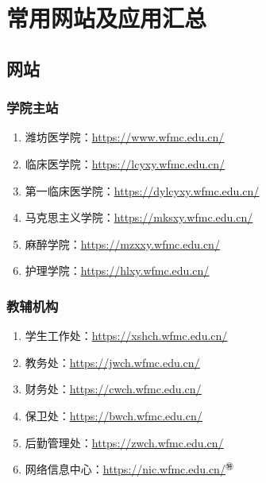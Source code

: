 \chapter[常用网站及应用汇总]{常用网站及应用汇总}
\section[网站]{网站}
\subsection[学院主站]{学院主站}
\begin{enumerate}
    \item 潍坊医学院：\uline{\href{https://www.wfmc.edu.cn/}{https://www.wfmc.edu.cn/}}
    \item 临床医学院：\uline{\href{https://lcyxy.wfmc.edu.cn/}{https://lcyxy.wfmc.edu.cn/}}
    \item 第一临床医学院：\uline{\href{https://dylcyxy.wfmc.edu.cn/}{https://dylcyxy.wfmc.edu.cn/}}
    \item 马克思主义学院：\uline{\href{https://mksxy.wfmc.edu.cn/}{https://mksxy.wfmc.edu.cn/}}
    \item 麻醉学院：\uline{\href{https://mzxxy.wfmc.edu.cn/}{https://mzxxy.wfmc.edu.cn/}}
    \item 护理学院：\uline{\href{https://hlxy.wfmc.edu.cn/}{https://hlxy.wfmc.edu.cn/}}
\end{enumerate}

\subsection[教辅机构]{教辅机构}
\begin{enumerate}
    \item 学生工作处：\uline{\href{https://xshch.wfmc.edu.cn/}{https://xshch.wfmc.edu.cn/}}
    \item 教务处：\uline{\href{https://jwch.wfmc.edu.cn/}{https://jwch.wfmc.edu.cn/}}
    \item 财务处：\uline{\href{https://cwch.wfmc.edu.cn/}{https://cwch.wfmc.edu.cn/}}
    \item 保卫处：\uline{\href{https://bwch.wfmc.edu.cn/}{https://bwch.wfmc.edu.cn/}}
    \item 后勤管理处：\uline{\href{https://zwch.wfmc.edu.cn/}{https://zwch.wfmc.edu.cn/}}
    \item 网络信息中心：\uline{\href{https://nic.wfmc.edu.cn/}{https://nic.wfmc.edu.cn/}$^㊕$}
\end{enumerate}

